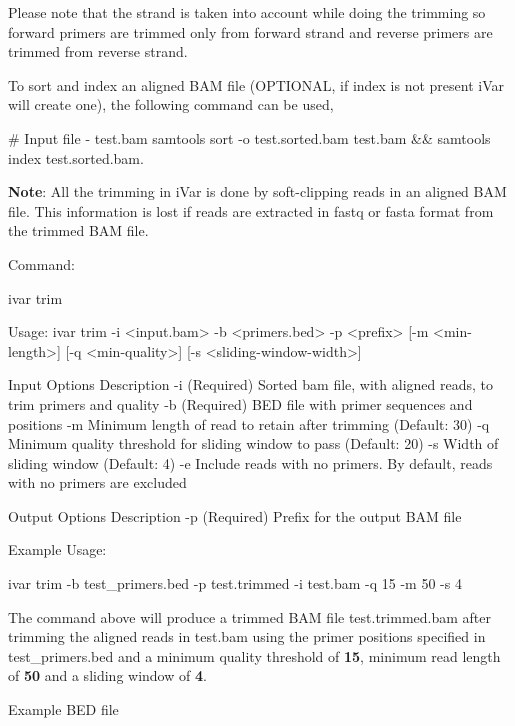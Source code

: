 Please note that the strand is taken into account while doing the trimming so forward primers are trimmed only from forward strand and reverse primers are trimmed from reverse strand.

To sort and index an aligned B\+AM file (O\+P\+T\+I\+O\+N\+AL, if index is not present i\+Var will create one), the following command can be used,


\begin{DoxyCode}
# Input file - test.bam
samtools sort -o test.sorted.bam test.bam && samtools index test.sorted.bam.
\end{DoxyCode}


{\bfseries Note}\+: All the trimming in i\+Var is done by soft-\/clipping reads in an aligned B\+AM file. This information is lost if reads are extracted in fastq or fasta format from the trimmed B\+AM file.

Command\+: 
\begin{DoxyCode}
ivar trim

Usage: ivar trim -i <input.bam> -b <primers.bed> -p <prefix> [-m <min-length>] [-q <min-quality>] [-s
       <sliding-window-width>]

Input Options    Description
           -i    (Required) Sorted bam file, with aligned reads, to trim primers and quality
           -b    (Required) BED file with primer sequences and positions
           -m    Minimum length of read to retain after trimming (Default: 30)
           -q    Minimum quality threshold for sliding window to pass (Default: 20)
           -s    Width of sliding window (Default: 4)
           -e    Include reads with no primers. By default, reads with no primers are excluded

Output Options   Description
           -p    (Required) Prefix for the output BAM file
\end{DoxyCode}


Example Usage\+: 
\begin{DoxyCode}
ivar trim -b test\_primers.bed -p test.trimmed -i test.bam -q 15 -m 50 -s 4
\end{DoxyCode}


The command above will produce a trimmed B\+AM file test.\+trimmed.\+bam after trimming the aligned reads in test.\+bam using the primer positions specified in test\+\_\+primers.\+bed and a minimum quality threshold of {\bfseries 15}, minimum read length of {\bfseries 50} and a sliding window of {\bfseries 4}.

Example B\+ED file


